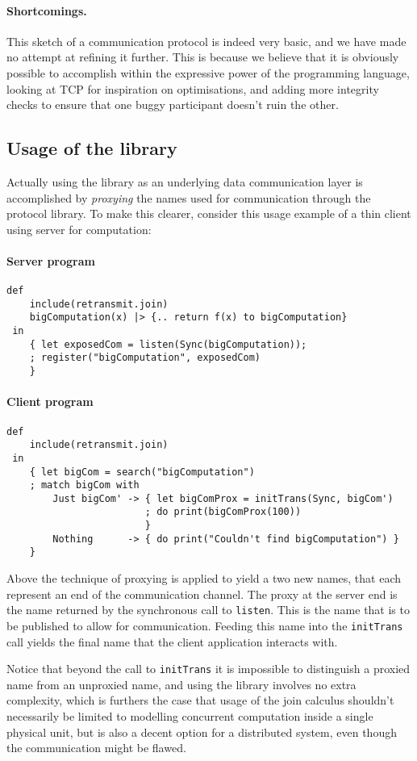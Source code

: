 \paragraph{Shortcomings.} This sketch of a communication protocol is indeed very
basic, and we have made no attempt at refining it further.  This is because we
believe that it is obviously possible to accomplish within the expressive power
of the programming language, looking at TCP for inspiration on optimisations,
and adding more integrity checks to ensure that one buggy participant doesn't
ruin the other.

\subsection{Usage of the library}

Actually using the library as an underlying data communication layer is
accomplished by \emph{proxying} the names used for communication through the
protocol library.  To make this clearer, consider this usage example of a thin
client using server for computation:

\paragraph{Server program}

\begin{verbatim}
def
    include(retransmit.join)
    bigComputation(x) |> {.. return f(x) to bigComputation}
 in
    { let exposedCom = listen(Sync(bigComputation));
    ; register("bigComputation", exposedCom)
    }
\end{verbatim}

\paragraph{Client program}

\begin{verbatim}
def
    include(retransmit.join)
 in
    { let bigCom = search("bigComputation")
    ; match bigCom with
        Just bigCom' -> { let bigComProx = initTrans(Sync, bigCom')
                        ; do print(bigComProx(100))
                        }
        Nothing      -> { do print("Couldn't find bigComputation") }
    }
\end{verbatim}

Above the technique of proxying is applied to yield a two new names,
that each represent an end of the communication channel.
The proxy at the server end is the name returned by the synchronous call to \texttt{listen}. This is the name that is to be published to allow for communication. Feeding this name into the \texttt{initTrans} call yields the final name that the client application interacts with.

Notice that beyond the call to \texttt{initTrans} it is impossible to distinguish a proxied name from an unproxied name, and using the library involves no extra complexity, which is furthers the case that usage of the join calculus shouldn't necessarily be limited to modelling concurrent computation inside a single physical unit, but is also a decent option for a distributed system, even though the communication might be flawed.

